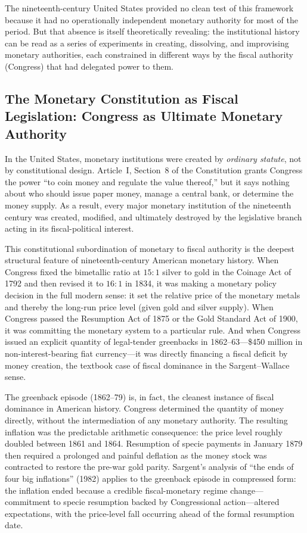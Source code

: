 \documentclass[12pt]{article}
\begin{document}
The nineteenth-century United States provided no clean test of this
framework because it had no operationally independent monetary
authority for most of the period.  But that absence is itself
theoretically revealing: the institutional history can be read as a
series of experiments in creating, dissolving, and improvising
monetary authorities, each constrained in different ways by the
fiscal authority (Congress) that had delegated power to them.

\subsection{The Monetary Constitution as Fiscal Legislation: Congress
as Ultimate Monetary Authority}

In the United States, monetary institutions were created by
\emph{ordinary statute}, not by constitutional design.  Article~I,
Section~8 of the Constitution grants Congress the power ``to coin
money and regulate the value thereof,'' but it says nothing about
who should issue paper money, manage a central bank, or determine
the money supply.  As a result, every major monetary institution
of the nineteenth century was created, modified, and ultimately
destroyed by the legislative branch acting in its fiscal-political
interest.

This constitutional subordination of monetary to fiscal authority
is the deepest structural feature of nineteenth-century American
monetary history.  When Congress fixed the bimetallic ratio at
$15:1$ silver to gold in the Coinage Act of 1792 and then revised
it to $16:1$ in 1834, it was making a monetary policy decision in
the full modern sense: it set the relative price of the monetary
metals and thereby the long-run price level (given gold and silver
supply).  When Congress passed the Resumption Act of 1875 or the
Gold Standard Act of 1900, it was committing the monetary system to
a particular rule.  And when Congress issued an explicit quantity of
legal-tender greenbacks in 1862--63---\$450 million in non-interest-bearing
fiat currency---it was directly financing a fiscal deficit by money
creation, the textbook case of fiscal dominance in the Sargent--Wallace
sense.

The greenback episode (1862--79) is, in fact, the cleanest instance
of fiscal dominance in American history.  Congress determined the
quantity of money directly, without the intermediation of any monetary
authority.  The resulting inflation was the predictable arithmetic
consequence: the price level roughly doubled between 1861 and 1864.
Resumption of specie payments in January 1879 then required a
prolonged and painful deflation as the money stock was contracted to
restore the pre-war gold parity.  Sargent's analysis of ``the ends of
four big inflations'' (1982) applies to the greenback episode in
compressed form: the inflation ended because a credible fiscal-monetary
regime change---commitment to specie resumption backed by Congressional
action---altered expectations, with the price-level fall occurring
ahead of the formal resumption date.
\end{document}
